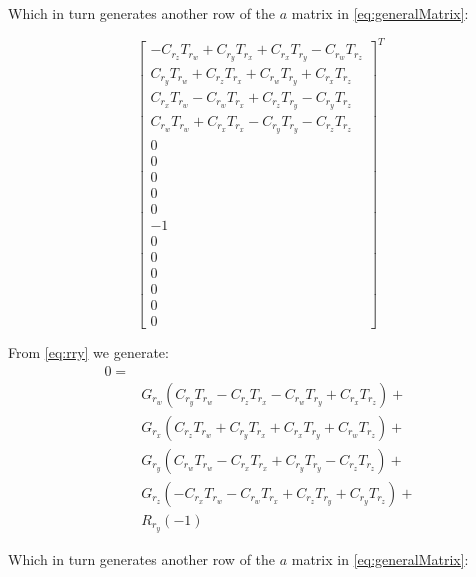 \documentclass[12pt]{article}
\begin{document}
	 Which in turn generates another row of the $a$ matrix in \autoref{eq:generalMatrix}:
	
	 \begin{equation}
	     \begin{bmatrix}
	     -C_{r_z} T_{r_w}+C_{r_y} T_{r_x}+C_{r_x} T_{r_y}-C_{r_w} T_{r_z}\\
	     C_{r_y} T_{r_w}+C_{r_z} T_{r_x}+C_{r_w} T_{r_y}+C_{r_x} T_{r_z}\\
	     C_{r_x} T_{r_w}-C_{r_w} T_{r_x}+C_{r_z} T_{r_y}-C_{r_y} T_{r_z}\\
	     C_{r_w} T_{r_w}+C_{r_x} T_{r_x}-C_{r_y} T_{r_y}-C_{r_z} T_{r_z}\\
	     0 \\ 0 \\ 0 \\ 0 \\ 0 \\ -1 \\ 0 \\ 0 \\ 0 \\ 0 \\ 0 \\ 0
	      \end{bmatrix}^T
	  \end{equation}
	
	
	From \autoref{eq:rry} we generate:
	\begin{equation}
	    \begin{split}
	0= \\&
	G_{r_w} (C_{r_y} T_{r_w}-C_{r_z} T_{r_x}-C_{r_w} T_{r_y}+C_{r_x} T_{r_z})+\\&
	G_{r_x} (C_{r_z} T_{r_w}+C_{r_y} T_{r_x}+C_{r_x} T_{r_y}+C_{r_w} T_{r_z})+\\&
	G_{r_y} (C_{r_w} T_{r_w}-C_{r_x} T_{r_x}+C_{r_y} T_{r_y}-C_{r_z} T_{r_z})+\\&
	G_{r_z} (-C_{r_x} T_{r_w}-C_{r_w} T_{r_x}+C_{r_z} T_{r_y}+C_{r_y} T_{r_z})+\\&
	 R_{r_y}(-1)
	 \end{split}
	 \end{equation}
	
	 Which in turn generates another row of the $a$ matrix in \autoref{eq:generalMatrix}:
	
\end{document}
